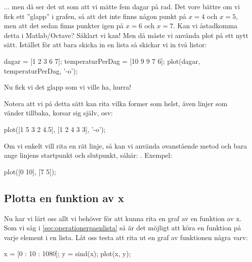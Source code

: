 ... men då ser det ut som att vi mätte fem dagar på rad. Det vore bättre om vi fick ett ''glapp'' i grafen, så att det inte finns någon punkt på $x=4$ och $x=5$, men att det sedan finns punkter igen på $x=6$ och $x=7$. Kan vi åstadkomma detta i Matlab/Octave? Såklart vi kan! Men då måste vi använda plot på ett nytt sätt. Istället för att bara skicka in en lista så skickar vi in två listor:

\begin{matlab}[caption={Syns att torsdag och fredag saknas},label={}]
dagar = [1 2 3 6 7]; %
temperaturPerDag = [10 9 9 7 6];
plot(dagar, temperaturPerDag, '-o');
\end{matlab}


Nu fick vi det glapp som vi ville ha, hurra!

Notera att vi på detta sätt kan rita vilka former som helst, även linjer som vänder tillbaka, korsar sig själv, osv:

\begin{matlab}[caption={Plotta vilken form som helst},label={}]
plot([1 5 3 2 4.5], [1 2 4 3 3], '-o');
\end{matlab}


Om vi enkelt vill rita en rät linje, så kan vi använda ovanstående metod och bara ange linjens startpunkt och slutpunkt, såhär:  . Exempel:
\begin{matlab}[caption={Rät linje},label={}]
plot([0 10], [7 5]);
\end{matlab}

\subsection{Plotta en funktion av x}
Nu har vi lärt oss allt vi behöver för att kunna rita en graf av en funktion av x. Som vi såg i \autoref{sec:operationerpaenlista} så är det möjligt att köra en funktion på varje element i en lista. Låt oss testa att rita ut en graf av funktionen  några varv: 

\begin{matlab}[caption={Plotta en sinusvåg},label={}]
x = [0 : 10 : 1080]; %
y = sind(x); %
plot(x, y); %
\end{matlab}

